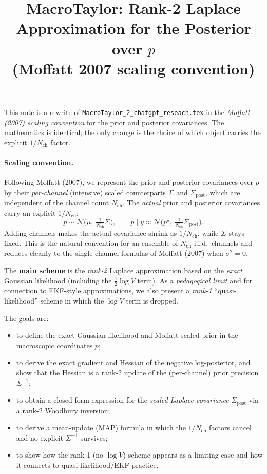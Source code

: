 \documentclass[11pt]{article}
\title{MacroTaylor: Rank-2 Laplace Approximation for the Posterior over $p$ \\
       \large (Moffatt 2007 scaling convention)}
\author{}
\date{}
\begin{document}
\maketitle

This note is a rewrite of \texttt{MacroTaylor\_2\_chatgpt\_reseach.tex} in the
\emph{Moffatt (2007) scaling convention} for the prior and posterior
covariances.  The mathematics is identical; the only change is the
choice of which object carries the explicit $1/N_{\text{ch}}$ factor.

\paragraph{Scaling convention.}
Following Moffatt (2007), we represent the prior and posterior
covariances over $p$ by their \emph{per-channel} (intensive) scaled
counterparts $\Sigma$ and $\Sigma_{\text{post}}$, which are independent
of the channel count $N_{\text{ch}}$.  The \emph{actual} prior and
posterior covariances carry an explicit $1/N_{\text{ch}}$:
\[
  p \sim \mathcal{N}\!\bigl(\mu,\ \tfrac{1}{N_{\text{ch}}}\Sigma\bigr),
  \qquad
  p\mid y
  \approx
  \mathcal{N}\!\bigl(p^\star,\ \tfrac{1}{N_{\text{ch}}}\Sigma_{\text{post}}\bigr).
\]
Adding channels makes the actual covariance shrink as $1/N_{\text{ch}}$,
while $\Sigma$ stays fixed.  This is the natural convention for an
ensemble of $N_{\text{ch}}$ i.i.d.\ channels and reduces cleanly to the
single-channel formulas of Moffatt (2007) when $\sigma^2 = 0$.

The \textbf{main scheme} is the \emph{rank-2} Laplace approximation
based on the \emph{exact} Gaussian likelihood (including the
$\tfrac12\log V$ term).  As a \emph{pedagogical limit} and for
connection to EKF-style approximations, we also present a
\emph{rank-1} ``quasi-likelihood'' scheme in which the $\log V$ term is
dropped.

The goals are:
\begin{itemize}
  \item to define the exact Gaussian likelihood and Moffatt-scaled
        prior in the macroscopic coordinates $p$;
  \item to derive the exact gradient and Hessian of the negative
        log-posterior, and show that the Hessian is a rank-2 update
        of the (per-channel) prior precision $\Sigma^{-1}$;
  \item to obtain a closed-form expression for the \emph{scaled
        Laplace covariance} $\Sigma_{\text{post}}$ via a rank-2
        Woodbury inversion;
  \item to derive a mean-update (MAP) formula in which the
        $1/N_{\text{ch}}$ factors cancel and no explicit $\Sigma^{-1}$
        survives;
  \item to show how the rank-1 (no $\log V$) scheme appears as a
        limiting case and how it connects to quasi-likelihood/EKF
        practice.
\end{itemize}
\end{document}
